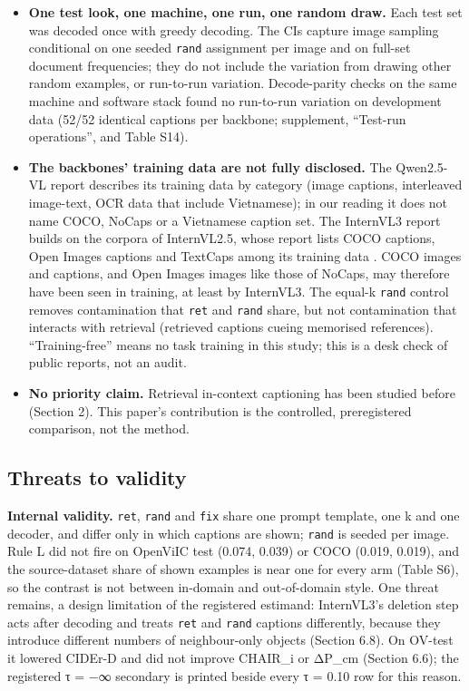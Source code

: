 \begin{itemize}
  rule's thresholds would not be caught. The same rule protected the English sets.
\item
  \textbf{One test look, one machine, one run, one random draw.} Each test set was decoded once with
  greedy decoding. The CIs capture image sampling conditional on one seeded \texttt{rand} assignment
  per image and on full-set document frequencies; they do not include the variation from drawing
  other random examples, or run-to-run variation. Decode-parity checks on the same machine and
  software stack found no run-to-run variation on development data (52/52 identical captions per
  backbone; supplement, ``Test-run operations'', and Table S14).
\item
  \textbf{The backbones' training data are not fully disclosed.} The Qwen2.5-VL report
  \citep{Bai2025Qwen25VL} describes its training data by category (image captions, interleaved
  image-text, OCR data that include Vietnamese); in our reading it does not name COCO, NoCaps or a
  Vietnamese caption set. The InternVL3 report \citep{Zhu2025InternVL3} builds on the corpora of
  InternVL2.5, whose report lists COCO captions, Open Images captions and TextCaps among its
  training data \citep{Chen2024InternVL25}. COCO images and captions, and Open Images images like
  those of NoCaps, may therefore have been seen in training, at least by InternVL3. The equal-k
  \texttt{rand} control removes contamination that \texttt{ret} and \texttt{rand} share, but not
  contamination that interacts with retrieval (retrieved captions cueing memorised references).
  ``Training-free'' means no task training in this study; this is a desk check of public reports,
  not an audit.
\item
  \textbf{No priority claim.} Retrieval in-context captioning has been studied before (Section 2).
  This paper's contribution is the controlled, preregistered comparison, not the method.
\end{itemize}

\subsection{Threats to validity}\label{threats-to-validity}

\textbf{Internal validity.} \texttt{ret}, \texttt{rand} and \texttt{fix} share one prompt template,
one k and one decoder, and differ only in which captions are shown; \texttt{rand} is seeded per
image. Rule L did not fire on OpenViIC test (0.074, 0.039) or COCO (0.019, 0.019), and the
source-dataset share of shown examples is near one for every arm (Table S6), so the contrast is not
between in-domain and out-of-domain style. One threat remains, a design limitation of the registered
estimand: InternVL3's deletion step acts after decoding and treats \texttt{ret} and \texttt{rand}
captions differently, because they introduce different numbers of neighbour-only objects (Section
6.8). On OV-test it lowered CIDEr-D and did not improve CHAIR\_i or ΔP\_cm (Section 6.6); the
registered τ = −∞ secondary is printed beside every τ = 0.10 row for this reason.

